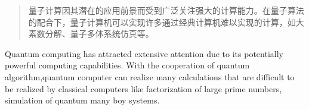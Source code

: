 

\begin{abstract}
  量子计算因其潜在的应用前景而受到广泛关注强大的计算能力。在量子算法的配合下，量子计算机可以实现许多通过经典计算机难以实现的计算，如大素数分解、量子多体系统仿真等。

\end{abstract}

\begin{abstract*}
  Quantum computing has attracted extensive attention due to its potentially powerful computing capabilities. With the cooperation of quantum algorithm,quantum computer can realize many calculations that are difficult to be realized by classical computers like factorization of large prime numbers, simulation of quantum many boy systems. 

\end{abstract*}
